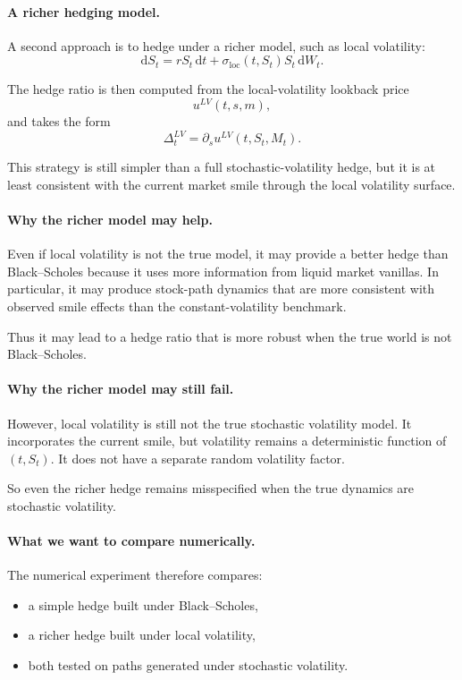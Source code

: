 \documentclass[11pt]{article}
\theoremstyle{plain}
\theoremstyle{definition}
\theoremstyle{remark}
\begin{document}
\paragraph{A richer hedging model.}
A second approach is to hedge under a richer model, such as local
volatility:
\[
\mathrm{d}S_t
=
rS_t\,\mathrm{d}t
+
\sigma_{\mathrm{loc}}(t,S_t)S_t\,\mathrm{d}W_t.
\]

The hedge ratio is then computed from the local-volatility lookback
price
\[
u^{LV}(t,s,m),
\]
and takes the form
\[
\Delta_t^{LV}
=
\partial_s u^{LV}(t,S_t,M_t).
\]

This strategy is still simpler than a full stochastic-volatility hedge,
but it is at least consistent with the current market smile through the
local volatility surface.

\paragraph{Why the richer model may help.}
Even if local volatility is not the true model, it may provide a better
hedge than Black--Scholes because it uses more information from liquid
market vanillas.
In particular, it may produce stock-path dynamics that are more
consistent with observed smile effects than the constant-volatility
benchmark.

Thus it may lead to a hedge ratio that is more robust when the true
world is not Black--Scholes.

\paragraph{Why the richer model may still fail.}
However, local volatility is still not the true stochastic volatility
model.
It incorporates the current smile, but volatility remains a deterministic
function of \((t,S_t)\).
It does not have a separate random volatility factor.

So even the richer hedge remains misspecified when the true dynamics are
stochastic volatility.

\paragraph{What we want to compare numerically.}
The numerical experiment therefore compares:
\begin{itemize}[leftmargin=1.4em]
    \item a simple hedge built under Black--Scholes,
    \item a richer hedge built under local volatility,
    \item both tested on paths generated under stochastic volatility.
\end{itemize}
\end{document}
